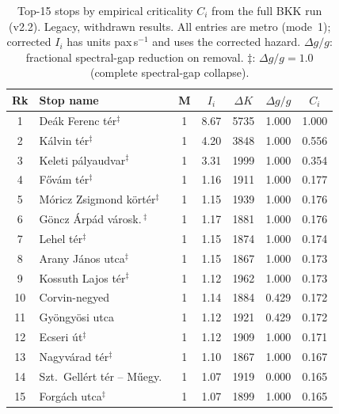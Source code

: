 \documentclass[11pt,a4paper]{article}
\theoremstyle{plain}
\theoremstyle{definition}
\theoremstyle{remark}
\begin{document}
\begin{table}[h]
\centering
\small
\caption{Top-15 stops by empirical criticality $C_i$ from the full BKK run (v2.2).
  Legacy, withdrawn results. All entries are metro (mode~1); corrected $I_i$
  has units pax\,s$^{-1}$ and uses the corrected hazard.
  $\Delta g/g$: fractional spectral-gap reduction on removal.
  $\ddagger$: $\Delta g/g=1.0$ (complete spectral-gap collapse).}
\label{tab:resilience}
\begin{tabular}{clccccc}
\toprule
Rk & Stop name & M & $I_i$ & $\Delta K$ & $\Delta g/g$ & $C_i$ \\
\midrule
1  & De\'ak Ferenc t\'er$^{\ddagger}$             & 1 & 8.67 & 5735 & 1.000 & 1.000 \\
2  & K\'alvin t\'er$^{\ddagger}$                  & 1 & 4.20 & 3848 & 1.000 & 0.556 \\
3  & Keleti p\'alyaudvar$^{\ddagger}$             & 1 & 3.31 & 1999 & 1.000 & 0.354 \\
4  & F\H{o}v\'am t\'er$^{\ddagger}$               & 1 & 1.16 & 1911 & 1.000 & 0.177 \\
5  & M\'oricz Zsigmond k\"{o}rt\'er$^{\ddagger}$  & 1 & 1.15 & 1939 & 1.000 & 0.176 \\
6  & G\"{o}ncz \'Arp\'ad v\'arosk.\,$^{\ddagger}$ & 1 & 1.17 & 1881 & 1.000 & 0.176 \\
7  & Lehel t\'er$^{\ddagger}$                     & 1 & 1.15 & 1874 & 1.000 & 0.174 \\
8  & Arany J\'anos utca$^{\ddagger}$              & 1 & 1.15 & 1867 & 1.000 & 0.173 \\
9  & Kossuth Lajos t\'er$^{\ddagger}$             & 1 & 1.12 & 1962 & 1.000 & 0.173 \\
10 & Corvin-negyed                                 & 1 & 1.14 & 1884 & 0.429 & 0.172 \\
11 & Gy\"{o}ngy\"{o}si utca                       & 1 & 1.12 & 1921 & 0.429 & 0.172 \\
12 & Ecseri \'ut$^{\ddagger}$                     & 1 & 1.12 & 1909 & 1.000 & 0.171 \\
13 & Nagyv\'arad t\'er$^{\ddagger}$               & 1 & 1.10 & 1867 & 1.000 & 0.167 \\
14 & Szt.\ Gell\'ert t\'er -- M\H{u}egy.\         & 1 & 1.07 & 1919 & 0.000 & 0.165 \\
15 & Forg\'ach utca$^{\ddagger}$                  & 1 & 1.07 & 1899 & 1.000 & 0.165 \\
\bottomrule
\end{tabular}
\end{table}
\end{document}
